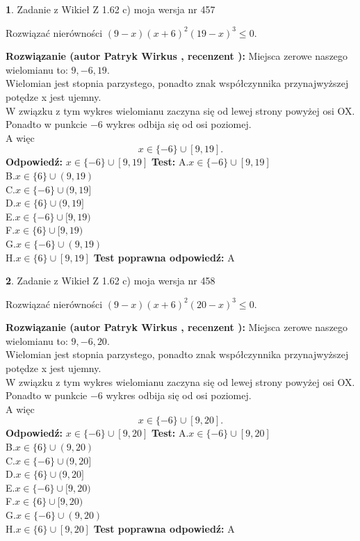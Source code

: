 \documentclass[12pt, a4paper]{article}
\theoremstyle{definition} %
\newtheorem{zad}{}
\newcommand{\zadStart}[1]{\begin{zad}#1\newline}
\newcommand{\zadStop}{\end{zad}}
\newcommand{\rozwStart}[2]{\noindent \textbf{Rozwiązanie (autor #1 , recenzent #2): }\newline}
\newcommand{\rozwStop}{\newline}
\newcommand{\odpStart}{\noindent \textbf{Odpowiedź:}\newline}
\newcommand{\odpStop}{\newline}
\newcommand{\testStart}{\noindent \textbf{Test:}\newline}
\newcommand{\testStop}{\newline}
\newcommand{\kluczStart}{\noindent \textbf{Test poprawna odpowiedź:}\newline}
\newcommand{\kluczStop}{\newline}
\begin{document}
\zadStart{Zadanie z Wikieł Z 1.62 c) moja wersja nr 457}

Rozwiązać nierówności $(9-x)(x+6)^{2}(19-x)^{3}\le0$.
\zadStop
\rozwStart{Patryk Wirkus}{}
Miejsca zerowe naszego wielomianu to: $9, -6, 19$.\\
Wielomian jest stopnia parzystego, ponadto znak współczynnika przy\linebreak najwyższej potędze x jest ujemny.\\ W związku z tym wykres wielomianu zaczyna się od lewej strony powyżej osi OX.\\
Ponadto w punkcie $-6$ wykres odbija się od osi poziomej.\\
A więc $$x \in \{-6\} \cup [9,19].$$
\rozwStop
\odpStart
$x \in \{-6\} \cup [9,19]$
\odpStop
\testStart
A.$x \in \{-6\} \cup [9,19]$\\
B.$x \in \{6\} \cup (9,19)$\\
C.$x \in \{-6\} \cup (9,19]$\\
D.$x \in \{6\} \cup (9,19]$\\
E.$x \in \{-6\} \cup [9,19)$\\
F.$x \in \{6\} \cup [9,19)$\\
G.$x \in \{-6\} \cup (9,19)$\\
H.$x \in \{6\} \cup [9,19]$
\testStop
\kluczStart
A
\kluczStop



\zadStart{Zadanie z Wikieł Z 1.62 c) moja wersja nr 458}

Rozwiązać nierówności $(9-x)(x+6)^{2}(20-x)^{3}\le0$.
\zadStop
\rozwStart{Patryk Wirkus}{}
Miejsca zerowe naszego wielomianu to: $9, -6, 20$.\\
Wielomian jest stopnia parzystego, ponadto znak współczynnika przy\linebreak najwyższej potędze x jest ujemny.\\ W związku z tym wykres wielomianu zaczyna się od lewej strony powyżej osi OX.\\
Ponadto w punkcie $-6$ wykres odbija się od osi poziomej.\\
A więc $$x \in \{-6\} \cup [9,20].$$
\rozwStop
\odpStart
$x \in \{-6\} \cup [9,20]$
\odpStop
\testStart
A.$x \in \{-6\} \cup [9,20]$\\
B.$x \in \{6\} \cup (9,20)$\\
C.$x \in \{-6\} \cup (9,20]$\\
D.$x \in \{6\} \cup (9,20]$\\
E.$x \in \{-6\} \cup [9,20)$\\
F.$x \in \{6\} \cup [9,20)$\\
G.$x \in \{-6\} \cup (9,20)$\\
H.$x \in \{6\} \cup [9,20]$
\testStop
\kluczStart
A
\kluczStop
\end{document}

